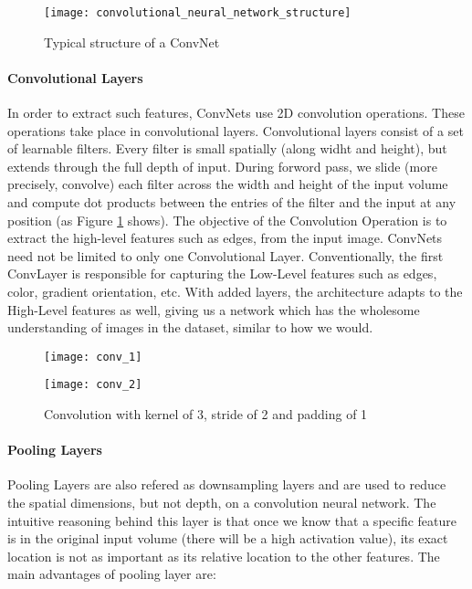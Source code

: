 \begin{figure}[h]
  \centering
  \texttt{[image: convolutional\_neural\_network\_structure]}
  \caption{Typical structure of a ConvNet}
\end{figure}
\paragraph{Convolutional Layers}
In order to extract such features, ConvNets use 2D convolution operations. These operations take place in convolutional layers. Convolutional
layers consist of a set of learnable filters. Every filter is small spatially (along widht and height), but extends through the full depth of
input. During forword pass, we slide (more precisely, convolve) each filter across the width and height of the input volume and compute dot
products between the entries of the filter and the input at any position (as Figure \ref{fig:conv_example} shows). The objective of the
Convolution Operation is to extract the high-level features such as edges, from the input image. ConvNets need not be limited to only one
Convolutional Layer. Conventionally, the first ConvLayer is responsible for capturing the Low-Level features such as edges, color, gradient
orientation, etc. With added layers, the architecture adapts to the High-Level features as well, giving us a network which has the wholesome
understanding of images in the dataset, similar to how we would.

\begin{figure}[h]
  \centering
  \begin{minipage}[b]{0.4\textwidth}
    \texttt{[image: conv\_1]}
  \end{minipage}
  \hfill
  \begin{minipage}[b]{0.4\textwidth}
    \texttt{[image: conv\_2]}
  \end{minipage}
  \caption{Convolution with kernel of 3, stride of 2 and padding of 1}
  \label{fig:conv_example}
\end{figure}
\paragraph{Pooling Layers}
Pooling Layers are also refered as downsampling layers and are used to reduce the spatial dimensions, but not depth, on a convolution neural network.
The intuitive reasoning behind this layer is that once we know that a specific feature is in the original input volume (there will be a high activation value),
its exact location is not as important as its relative location to the other features. The main advantages of pooling layer are:

